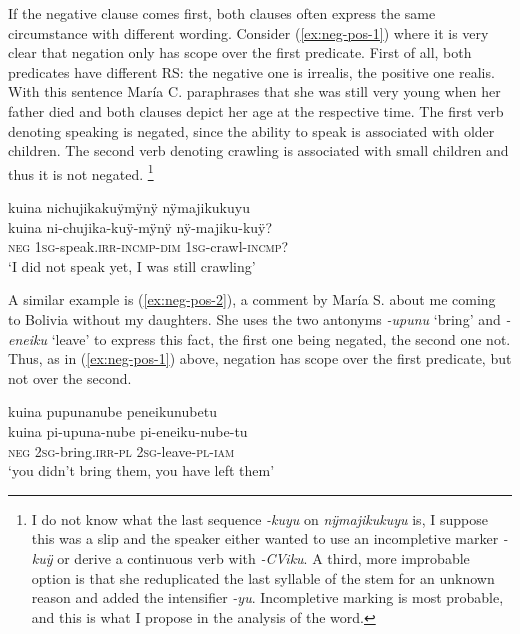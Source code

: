 If the negative clause comes first, both clauses often express the same circumstance with different wording. Consider (\ref{ex:neg-pos-1}) where it is very clear that negation only has scope over the first predicate. First of all, both predicates have different RS: the negative one is irrealis, the positive one realis. With this sentence María C. paraphrases that she was still very young when her father died and both clauses depict her age at the respective time. The first verb denoting speaking is negated, since the ability to speak is associated with older children. The second verb denoting crawling is associated with small children and thus it is not negated. \footnote{I do not know what the last sequence \textit{-kuyu} on \textit{nÿmajikukuyu} is, I suppose this was a slip and the speaker either wanted to use an incompletive marker \textit{-kuÿ} or derive a continuous verb with \textit{-CViku}. A third, more improbable option is that she reduplicated the last syllable of the stem for an unknown reason and added the intensifier \textit{-yu}. Incompletive marking is most probable, and this is what I propose in the analysis of the word.}

\ea\label{ex:neg-pos-1}
\begingl
\glpreamble kuina nichujikakuÿmÿnÿ nÿmajikukuyu\\
\gla kuina ni-chujika-kuÿ-mÿnÿ nÿ-majiku-kuÿ?\\
\glb \textsc{neg} 1\textsc{sg}-speak.\textsc{irr}-\textsc{incmp}-\textsc{dim} 1\textsc{sg}-crawl-\textsc{incmp}?\\
\glft ‘I did not speak yet, I was still crawling’
\endgl
\trailingcitation{[cux-c120414ls-2.278]}
\xe


A similar example is (\ref{ex:neg-pos-2}), a comment by María S. about me coming to Bolivia without my daughters. She uses the two antonyms \textit{-upunu} ‘bring’ and \textit{-eneiku} ‘leave’ to express this fact, the first one being negated, the second one not. Thus, as in (\ref{ex:neg-pos-1}) above, negation has scope over the first predicate, but not over the second.

\ea\label{ex:neg-pos-2}
\begingl
\glpreamble kuina pupunanube peneikunubetu\\
\gla kuina pi-upuna-nube pi-eneiku-nube-tu\\
\glb \textsc{neg} 2\textsc{sg}-bring.\textsc{irr}-\textsc{pl} 2\textsc{sg}-leave-\textsc{pl}-\textsc{iam}\\
\glft ‘you didn’t bring them, you have left them’
\endgl
\trailingcitation{[rmx-e150922l.079]}
\xe


